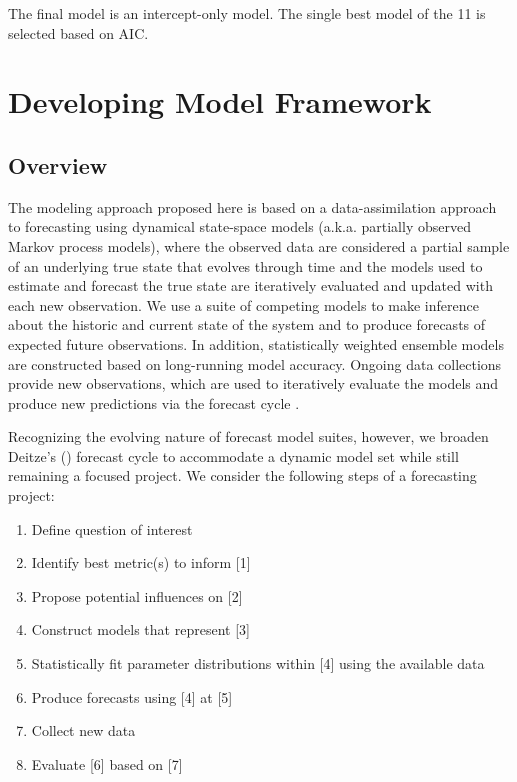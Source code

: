 \documentclass{article}
\begin{document}
The final model is an intercept-only model. The single best model of the 11 is selected based on AIC. 

\section{Developing Model Framework}
\label{sec:devmods}

\subsection{Overview}
\label{subsec:devmods_ov}

The modeling approach proposed here is based on a data-assimilation approach to forecasting using dynamical state-space models (a.k.a. partially observed Markov process models), where the observed data are considered a partial sample of an underlying true state that evolves through time \citep{Ionides2006, King2016} and the models used to estimate and forecast the true state are iteratively evaluated and updated with each new observation. We use a suite of competing models to make inference about the historic and current state of the system and to produce forecasts of expected future observations. In addition, statistically weighted ensemble models are constructed based on long-running model accuracy. Ongoing data collections provide new observations, which are used to iteratively evaluate the models and produce new predictions via the forecast cycle \citep{Dietze2017}. 

Recognizing the evolving nature of forecast model suites, however, we broaden Deitze's (\citeyear{Dietze2017}) forecast cycle to accommodate a dynamic model set while still remaining a focused project. We consider the following steps of a forecasting project:

\begin{enumerate}
\item{Define question of interest} 
\item{Identify best metric(s) to inform [1]}
\item{Propose potential influences on [2]} 
\item{Construct models that represent [3]}
\item{Statistically fit parameter distributions within [4] using the available data}
\item{Produce forecasts using [4] at [5]} 
\item{Collect new data}
\item{Evaluate [6] based on [7]}
\end{enumerate}
\end{document}
